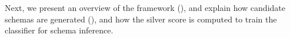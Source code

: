Next, we present an overview of the framework (),
and explain how candidate schemas are generated (),
and how the silver score is computed to train the classifier for
schema inference.

%
%
%
%
%
